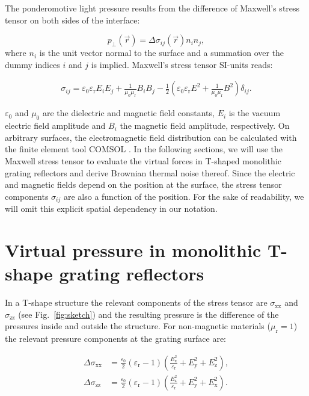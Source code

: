 \documentclass[twocolumn,secnumarabic,amssymb, nobibnotes, aps, prd, showpacs]{revtex4-1}
\begin{document}
\noindent The ponderomotive light pressure results from the difference of Maxwell's stress tensor on both sides of the interface:

\begin{equation}
 p_{\perp}(\vec{r})=\Delta \sigma_{ij}(\vec{r})n_{i}n_{j},
\end{equation}
where $n_{i}$ is the unit vector normal to the surface and a summation over the dummy indices $i$ and $j$ is implied.    
\noindent Maxwell's stress tensor SI-units reads:

\begin{align}
	\sigma_{ij}= \varepsilon_0\varepsilon_\mathrm{r} E_i E_j + \frac{1}{\mu_0\mu_\mathrm{r}} B_i B_j - \frac{1}{2}\left(\varepsilon_0\varepsilon_\mathrm{r} E^2 + \frac{1}{\mu_0\mu_\mathrm{r}}B^2\right)\delta_{ij}.
	\label{Eq:Ediss}
\end{align}

\noindent $\varepsilon_0$ and $\mu_0$ are the dielectric and magnetic field constants, $E_i$ is the vacuum electric field amplitude and $B_i$ the magnetic field amplitude, respectively. On arbitrary surfaces, the electromagnetic field distribution can be calculated with the finite element tool COMSOL \cite{comsol}.
In the following sections, we will use the Maxwell stress tensor to evaluate the virtual forces in T-shaped monolithic grating reflectors and derive Brownian thermal noise thereof. Since the electric and magnetic fields depend on the position at the surface, the stress tensor components $\sigma_{ij}$ are also a function of the position. For the sake of readability, we will omit this explicit spatial dependency in our notation. 


\section{Virtual pressure in monolithic T-shape grating reflectors}

\noindent In a T-shape structure the relevant components of the stress tensor are $\sigma_\mathrm{xx}$ and $\sigma_\mathrm{zz}$ (see Fig.~\ref{fig:sketch}) and the resulting pressure is the difference of the pressures inside and outside the structure. For non-magnetic materials ($\mu_\mathrm{r}=1$) the relevant pressure components at the grating surface are: 

\begin{align}
\Delta	\sigma_\mathrm{xx} &= \frac{\varepsilon_0}{2} (\varepsilon_\mathrm{r}-1) \left( \frac{E_\mathrm{x}^2}{\varepsilon_\mathrm{r}}+
E_\mathrm{y}^2+E_\mathrm{z}^2\right), \\
\Delta	\sigma_\mathrm{zz} &= \frac{\varepsilon_0}{2} (\varepsilon_\mathrm{r}-1) \left( \frac{E_\mathrm{z}^2}{\varepsilon_\mathrm{r}}+
E_\mathrm{y}^2+E_\mathrm{x}^2\right).
\label{Eq:maxwell}
\end{align}
\end{document}
